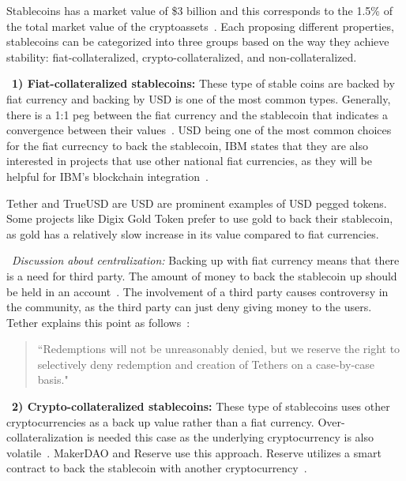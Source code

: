 Stablecoins has a market value of \$3 billion and this corresponds to the 1.5\% of the total market value of the cryptoassets~\cite{report}. Each proposing different properties, stablecoins can be categorized into three groups based on the way they achieve stability: fiat-collateralized, crypto-collateralized, and non-collateralized.

~\textbf{1) Fiat-collateralized stablecoins:} These type of stable coins are backed by fiat currency and backing by USD is one of the most common types. Generally, there is a 1:1 peg between the fiat currency and the stablecoin that indicates a convergence between their values~\cite{linkedin}. USD being one of the most common choices for the fiat currecncy to back the stablecoin, IBM states that they are also interested in projects that use other national fiat currencies, as they will be helpful for IBM's blockchain integration~\cite{cointelegraph}.


Tether and TrueUSD are USD are prominent examples of USD pegged tokens. Some projects like Digix Gold Token prefer to use gold to back their stablecoin, as gold has a relatively slow increase in its value compared to fiat currencies. %

~\textit{Discussion about centralization:} Backing up with fiat currency means that there is a need for third party. The amount of money to back the stablecoin up should be held in an account~\cite{techrev}. The involvement of a third party causes controversy in the community, as the third party can just deny giving money to the users. Tether explains this point as follows~\cite{cryptoinsider}:

\begin{quote}
``Redemptions will not be unreasonably denied, but we reserve the right to selectively deny redemption and creation of Tethers on a case-by-case basis."
\end{quote}


~\textbf{2) Crypto-collateralized stablecoins:} These type of stablecoins uses other cryptocurrencies as a back up value rather than a fiat currency. Over-collateralization is needed this case as the underlying cryptocurrency is also volatile~\cite{linkedin}. MakerDAO and Reserve use this approach. Reserve utilizes a smart contract to back the stablecoin with another cryptocurrency~\cite{cointelegraph}.

